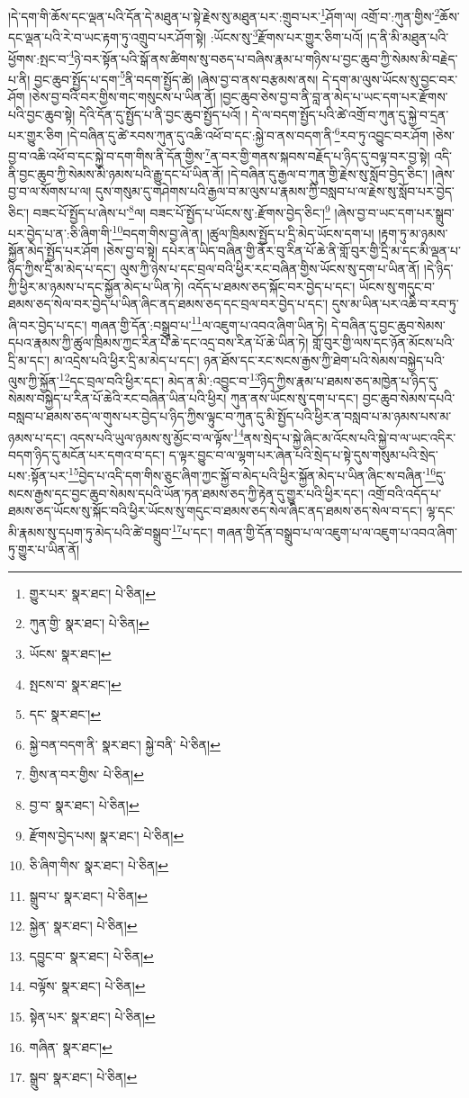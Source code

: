 །དེ་དག་གི་ཆོས་དང་ལྡན་པའི་དོན་དེ་མཐུན་པ་སྟེ་རྗེས་སུ་མཐུན་པར་:གྲུབ་པར་\footnote{གྱུར་པར་  སྣར་ཐང་།  པེ་ཅིན། }ཤོག་ལ། འགྲོ་བ་:ཀུན་གྱིས་\footnote{ཀུན་གྱི་  སྣར་ཐང་།  པེ་ཅིན། }ཆོས་དང་ལྡན་པའི་རེ་བ་ཡང་རྟག་ཏུ་འགྲུབ་པར་ཤོག་སྟེ། :ཡོངས་སུ་\footnote{ཡོངས་  སྣར་ཐང་། }རྫོགས་པར་གྱུར་ཅིག་པའོ། །ད་ནི་མི་མཐུན་པའི་ཕྱོགས་:སྤང་བ་\footnote{སྤངས་བ་  སྣར་ཐང་། }ཉེ་བར་སྟོན་པའི་སྒོ་ནས་ཚིགས་སུ་བཅད་པ་བཞིས་རྣམ་པ་གཉིས་པ་བྱང་ཆུབ་ཀྱི་སེམས་མི་བརྗེད་པ་ནི། བྱང་ཆུབ་སྤྱོད་པ་དག་\footnote{དང་  སྣར་ཐང་། }ནི་བདག་སྤྱོད་ཚེ། །ཞེས་བྱ་བ་ནས་བརྩམས་ནས། དེ་དག་མ་ལུས་ཡོངས་སུ་བྱང་བར་ཤོག །ཅེས་བྱ་བའི་བར་གྱིས་གང་གསུངས་པ་ཡིན་ནོ། །བྱང་ཆུབ་ཅེས་བྱ་བ་ནི་བླ་ན་མེད་པ་ཡང་དག་པར་རྫོགས་པའི་བྱང་ཆུབ་སྟེ། དེའི་དོན་དུ་སྤྱོད་པ་ནི་བྱང་ཆུབ་སྤྱོད་པའོ། །
དེ་ལ་བདག་སྤྱོད་པའི་ཚེ་འགྲོ་བ་ཀུན་དུ་སྐྱེ་བ་དྲན་པར་གྱུར་ཅིག །དེ་བཞིན་དུ་ཚེ་རབས་ཀུན་དུ་འཆི་འཕོ་བ་དང་:སྐྱེ་བ་ནས་བདག་ནི་\footnote{སྐྱེ་བན་བདག་ནི་  སྣར་ཐང་། སྐྱེ་བནི་  པེ་ཅིན། }རབ་ཏུ་འབྱུང་བར་ཤོག །ཅེས་བྱ་བ་འཆི་འཕོ་བ་དང་སྐྱེ་བ་དག་གིས་ནི་དོན་གྱིས་\footnote{གྱིས་ན་བར་གྱིས་  པེ་ཅིན། }ན་བར་གྱི་གནས་སྐབས་བརྗོད་པ་ཉིད་དུ་བལྟ་བར་བྱ་སྟེ། འདི་ནི་བྱང་ཆུབ་ཀྱི་སེམས་མི་ཉམས་པའི་རྒྱུ་དང་པོ་ཡིན་ནོ། །དེ་བཞིན་དུ་རྒྱལ་བ་ཀུན་གྱི་རྗེས་སུ་སློབ་བྱེད་ཅིང་། །ཞེས་བྱ་བ་ལ་སོགས་པ་ལ། དུས་གསུམ་དུ་གཤེགས་པའི་རྒྱལ་བ་མ་ལུས་པ་རྣམས་ཀྱི་བསླབ་པ་ལ་རྗེས་སུ་སློབ་པར་བྱེད་ཅིང་། བཟང་པོ་སྤྱོད་པ་ཞེས་པ་\footnote{བྱ་བ་  སྣར་ཐང་།  པེ་ཅིན། }ལ། བཟང་པོ་སྤྱོད་པ་ཡོངས་སུ་:རྫོགས་བྱེད་ཅིང་།\footnote{རྫོགས་བྱེད་པས།  སྣར་ཐང་།  པེ་ཅིན། } །ཞེས་བྱ་བ་ཡང་དག་པར་སྒྲུབ་པར་བྱེད་པ་ན་:ཅི་ཞིག་གི་\footnote{ཅི་ཞིག་གིས་  སྣར་ཐང་།  པེ་ཅིན། }བདག་གིས་བྱ་ཞེ་ན། །ཚུལ་ཁྲིམས་སྤྱོད་པ་དྲི་མེད་ཡོངས་དག་པ། །རྟག་ཏུ་མ་ཉམས་སྐྱོན་མེད་སྤྱོད་པར་ཤོག །ཅེས་བྱ་བ་སྟེ། དཔེར་ན་ཡིད་བཞིན་གྱི་ནོར་བུ་རིན་པོ་ཆེ་ནི་གློ་བུར་གྱི་དྲི་མ་དང་མི་ལྡན་པ་ཉིད་ཀྱིས་དྲི་མ་མེད་པ་དང་། ལུས་ཀྱི་ཉེས་པ་དང་བྲལ་བའི་ཕྱིར་རང་བཞིན་གྱིས་ཡོངས་སུ་དག་པ་ཡིན་ནོ། །དེ་ཉིད་ཀྱི་ཕྱིར་མ་ཉམས་པ་དང་སྐྱོན་མེད་པ་ཡིན་ཏེ། འདོད་པ་ཐམས་ཅད་སྐོང་བར་བྱེད་པ་དང་། ཡོངས་སུ་གདུང་བ་ཐམས་ཅད་སེལ་བར་བྱེད་པ་ཡིན་ཞིང་ནད་ཐམས་ཅད་དང་བྲལ་བར་བྱེད་པ་དང་། དུས་མ་ཡིན་པར་འཆི་བ་རབ་ཏུ་ཞི་བར་བྱེད་པ་དང་། གཞན་གྱི་དོན་:བསྒྲུབ་པ་\footnote{སྒྲུབ་པ་  སྣར་ཐང་།  པེ་ཅིན། }ལ་འཇུག་པ་འབའ་ཞིག་ཡིན་ཏེ། དེ་བཞིན་དུ་བྱང་ཆུབ་སེམས་དཔའ་རྣམས་ཀྱི་ཚུལ་ཁྲིམས་ཀྱང་རིན་པོ་ཆེ་དང་འདྲ་བས་རིན་པོ་ཆེ་ཡིན་ཏེ། གློ་བུར་གྱི་ལས་དང་ཉོན་མོངས་པའི་དྲི་མ་དང་། མ་འདྲེས་པའི་ཕྱིར་དྲི་མ་མེད་པ་དང་། ཉན་ཐོས་དང་རང་སངས་རྒྱས་ཀྱི་ཐེག་པའི་སེམས་བསྐྱེད་པའི་ལུས་ཀྱི་སྐྱོན་\footnote{སྐྱེན་  སྣར་ཐང་།  པེ་ཅིན། }དང་བྲལ་བའི་ཕྱིར་དང་། མེད་ན་མི་:འབྱུང་བ་\footnote{དབྱུང་བ་  སྣར་ཐང་།  པེ་ཅིན། }ཉིད་ཀྱིས་རྣམ་པ་ཐམས་ཅད་མཁྱེན་པ་ཉིད་དུ་སེམས་བསྐྱེད་པ་རིན་པོ་ཆེའི་རང་བཞིན་ཡིན་པའི་ཕྱིར། ཀུན་ནས་ཡོངས་སུ་དག་པ་དང་། བྱང་ཆུབ་སེམས་དཔའི་བསླབ་པ་ཐམས་ཅད་ལ་གུས་པར་བྱེད་པ་ཉིད་ཀྱིས་ལྟུང་བ་ཀུན་དུ་མི་སྤྱོད་པའི་ཕྱིར་ན་བསླབ་པ་མ་ཉམས་པས་མ་ཉམས་པ་དང་། འདས་པའི་ཡུལ་ཉམས་སུ་མྱོང་བ་ལ་ལྟོས་\footnote{བལྟོས་  སྣར་ཐང་།  པེ་ཅིན། }ནས་སྲེད་པ་སྐྱེ་ཞིང་མ་འོངས་པའི་སྐྱེ་བ་ལ་ཡང་འདིར་བདག་ཉིད་དུ་མངོན་པར་དགའ་བ་དང་། ད་ལྟར་བྱུང་བ་ལ་ལྷག་པར་ཞེན་པའི་སྲེད་པ་སྟེ་དུས་གསུམ་པའི་སྲེད་པས་:སྟོན་པར་\footnote{སྟེན་པར་  སྣར་ཐང་།  པེ་ཅིན། }བྱེད་པ་འདི་དག་གིས་ཅུང་ཞིག་ཀྱང་སྐྱོ་བ་མེད་པའི་ཕྱིར་སྐྱོན་མེད་པ་ཡིན་ཞིང་ས་བཞིན་\footnote{གཞིན་  སྣར་ཐང་། }དུ་སངས་རྒྱས་དང་བྱང་ཆུབ་སེམས་དཔའི་ཡོན་ཏན་ཐམས་ཅད་ཀྱི་རྟེན་དུ་གྱུར་པའི་ཕྱིར་དང་། འགྲོ་བའི་འདོད་པ་ཐམས་ཅད་ཡོངས་སུ་སྐོང་བའི་ཕྱིར་ཡོངས་སུ་གདུང་བ་ཐམས་ཅད་སེལ་ཞིང་ནད་ཐམས་ཅད་སེལ་བ་དང་། ལྷ་དང་མི་རྣམས་སུ་དཔག་ཏུ་མེད་པའི་ཚེ་བསྒྲུབ་\footnote{སྒྲུབ་  སྣར་ཐང་།  པེ་ཅིན། }པ་དང་། གཞན་གྱི་དོན་བསྒྲུབ་པ་ལ་འཇུག་པ་ལ་འཇུག་པ་འབའ་ཞིག་ཏུ་གྱུར་པ་ཡིན་ནོ། 